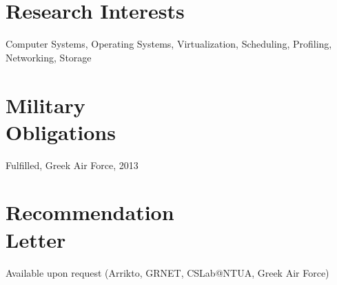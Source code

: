 \documentclass[margin,centered]{res}
\begin{document}
\begin{resume}
\section{\sc Research Interests}
Computer Systems, Operating Systems, Virtualization, Scheduling, Profiling, Networking, Storage

\section{\sc Military\\Obligations}
Fulfilled, Greek Air Force, 2013

\section{\sc Recommendation\\Letter}
Available upon request (Arrikto, GRNET, CSLab@NTUA, Greek Air Force)

\end{resume}

\def\enoteheading{\section{Notes}\rule[0pt]{\textwidth}{0.4pt}}
\parskip=2pt
\theendnotes
\end{document}
